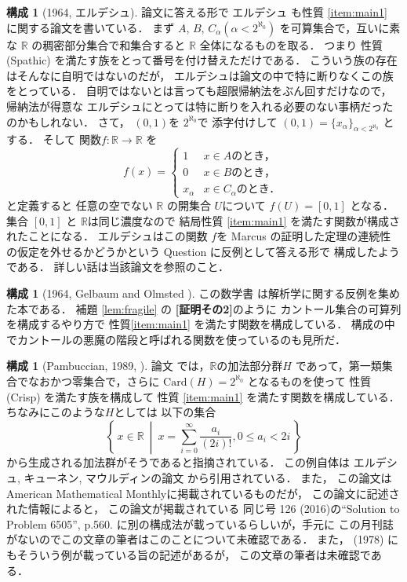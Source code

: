 \documentclass[leqno, a4paper, 12pt]{jsarticle}
\theoremstyle{definition}
\newtheorem{con}[thm]{構成}
\newcommand{\rr}{\mathbb{R}}
\newcommand{\card}{\mathrm{Card}}
\newcommand{\myco}{2^{\aleph_{0}}}
\newcommand{\mysei}{\textup{(Crisp)}}
\newcommand{\mysw}{\textup{(Spathic)}}
\begin{document}
\begin{con}[1964, エルデシュ\cite{MR0197631}]\label{con:er}
論文\cite{MR0185058}に答える形で
エルデシュ
も性質
\ref{item:main1}
に関する論文を書いている．
まず
$A$, 
$B$, 
$C_{\alpha} (\alpha<\myco)$ 
を可算集合で，互いに素な
$\rr$
の稠密部分集合で和集合すると
$\rr$
全体になるものを取る．
つまり
性質
\mysw
を満たす族をとって番号を付け替えただけである．
こういう族の存在はそんなに自明ではないのだが，
エルデシュは論文の中で特に断りなくこの族をとっている．
自明ではないとは言っても超限帰納法をぶん回すだけなので，
帰納法が得意な
エルデシュにとっては特に断りを入れる必要のない事柄だったのかもしれない．
さて，
$(0, 1)$を
$\myco$で
添字付けして
$(0, 1)=\{x_{\alpha}\}_{\alpha<\myco}$
とする．
そして
関数$f\colon \rr\to \rr$
を
\[
f(x)=
\begin{cases}
1 & \text{$x\in A$のとき，}\\
0 & \text{$x\in B$のとき，}\\
x_{\alpha}& \text{$x\in C_{\alpha}$のとき．}
\end{cases}
\]
と定義すると
任意の空でない
$\rr$
の開集合
$U$について
$f(U)=[0, 1]$
となる．
集合
$[0, 1]$
と
$\rr$は同じ濃度なので
結局性質
\ref{item:main1}
を満たす関数が構成されたことになる．
エルデシュはこの関数
$f$を
Marcus 
\cite{MR0177072}の証明した定理の連続性の仮定を外せるかどうかという
Question 
に反例として答える形で
構成したようである．
詳しい話は当該論文を参照のこと．
\end{con}

\begin{con}[1964, Gelbaum and Olmsted ]\label{con:counter}
この数学書
\cite{MR1996162}
は解析学に関する反例を集めた本である．
補題
\ref{lem:fragile}
の
\textbf{[証明その2]}のように
カントール集合の可算列を構成するやり方で
性質\ref{item:main1}
を満たす関数を構成している．
構成の中でカントールの悪魔の階段と呼ばれる関数を使っているのも見所だ．
\end{con}

\begin{con}[Pambuccian, 1989, \cite{MR1033359}]\label{con:pam}
論文\cite{MR1033359}
では，$\rr$の加法部分群$H$
であって，第一類集合でなおかつ零集合で，さらに
$\card(H)=\myco$
となるものを使って
性質
\mysei
を満たす族を構成して
性質
\ref{item:main1}
を満たす関数を構成している．
ちなみにこのような$H$としては
以下の集合
\[
\left\{\, 
x\in \rr\ \middle|\  x=\sum_{i=0}^{\infty}\frac{a_{i}}{(2i)!}, 
0\le a_{i}<2i
\, \right\}
\]
から生成される加法群がそうであると指摘されている．
この例自体は
エルデシュ, キューネン, マウルディンの論文
\cite{MR0641304}
から引用されている．
また，
この論文\cite{MR1033359}はAmerican  Mathematical  Monthlyに掲載されているものだが，
この論文\cite{MR1033359}に記述された情報によると，
この論文が掲載されている
同じ号
126 (2016)の``Solution to Problem 6505'', p.560. 
に別の構成法が載っているらしいが，手元に
この月刊誌がないのでこの文章の筆者はこのことについて未確認である．
また，
\cite[Ch. I, Example 1.2 and Thm. 3.4]{MR0507448}(1978)
にもそういう例が載っている旨の記述があるが，
この文章の筆者は未確認である．
\end{con}
\end{document}
